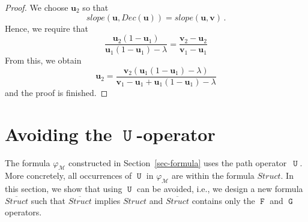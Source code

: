 \documentclass[a4paper,UKenglish,cleveref, autoref, thm-restate]{lipics-v2021}
\newcommand{\M}{\mathcal{M}}
\newcommand{\slope}{\mathit{slope}}
\newcommand{\DEC}{\mathit{Dec}}
\renewcommand{\vec}[1]{\pmb{#1}}
\newcommand{\Struct}{\textit{Struct}}
\newcommand*{\opu}{\operatorname{\pmb{\mathtt{U}}}}
\newcommand*{\opf}{\operatorname{\pmb{\mathtt{F}}}}
\newcommand*{\opg}{\operatorname{\pmb{\mathtt{G}}}}
\begin{document}
\outlineseg*
\begin{proof}
We choose $\vec{u}_2$ so that 
\[
    \slope(\vec{u},\DEC(\vec{u})) = \slope(\vec{u},\vec{v})\,.
\]
Hence, we require that
\[
     \frac{\vec{u}_2(1-\vec{u}_1)}{\vec{u}_1(1-\vec{u}_1) - \lambda}    =
     \frac{\vec{v}_2 - \vec{u}_2}{\vec{v}_1 - \vec{u}_1}
\]
From this, we obtain
\[
    \vec{u}_2 = \frac{\vec{v}_2(\vec{u}_1(1-\vec{u}_1)-\lambda)}{\vec{v}_1 - \vec{u}_1 +  \vec{u}_1(1-\vec{u}_1) - \lambda}    
\]
and the proof is finished.
\end{proof}
 







































































\section{Avoiding the $\opu$-operator}
\label{sec-U-avoid}

The formula $\varphi_\M$ constructed in Section~\ref{sec-formula} uses the path operator~$\opu$. More concretely, all occurrences of $\opu$ in $\varphi_\M$ are within the formula $\Struct$. In this section, we show that using $\opu$ can be avoided, i.e., we design a new formula $\overline{\Struct}$ such that $\overline{\Struct}$ implies $\Struct$ and $\overline{\Struct}$ contains only the $\opf$ and $\opg$ operators.
\end{document}
